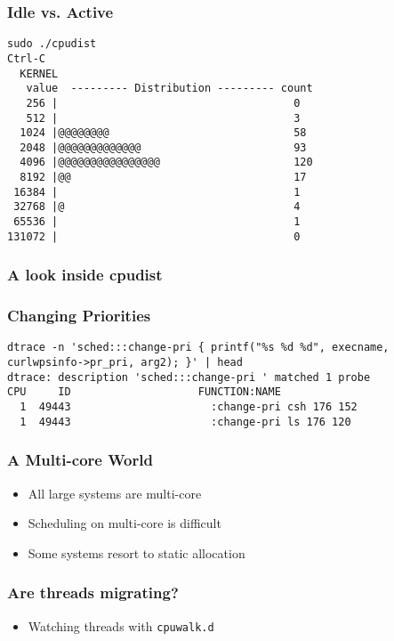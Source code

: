 \documentclass[pdftex]{beamer}
\begin{document}
\begin{frame}[fragile]
  \frametitle{Idle vs. Active}
  \centering
\begin{lstlisting}
sudo ./cpudist
Ctrl-C
  KERNEL 
   value  --------- Distribution --------- count    
   256 |                                     0        
   512 |                                     3        
  1024 |@@@@@@@@                             58       
  2048 |@@@@@@@@@@@@@                        93       
  4096 |@@@@@@@@@@@@@@@@                     120      
  8192 |@@                                   17       
 16384 |                                     1        
 32768 |@                                    4        
 65536 |                                     1        
131072 |                                     0        
\end{lstlisting}
\end{frame}

\begin{frame}
  \frametitle{A look inside cpudist}
  
\end{frame}

\begin{frame}[fragile]
  \frametitle{Changing Priorities}
\begin{lstlisting}
dtrace -n 'sched:::change-pri { printf("%s %d %d", execname, curlwpsinfo->pr_pri, arg2); }' | head
dtrace: description 'sched:::change-pri ' matched 1 probe
CPU     ID                    FUNCTION:NAME
  1  49443                      :change-pri csh 176 152
  1  49443                      :change-pri ls 176 120
\end{lstlisting}
\end{frame}

\begin{frame}
  \frametitle{A Multi-core World}
  \begin{itemize}
  \item All large systems are multi-core
  \item Scheduling on multi-core is difficult
  \item Some systems resort to static allocation
  \end{itemize}
\end{frame}

\begin{frame}[fragile]
  \frametitle{Are threads migrating?}
  \begin{itemize}
  \item Watching threads with \verb+cpuwalk.d+
  \end{itemize}
\end{frame}
\end{document}
